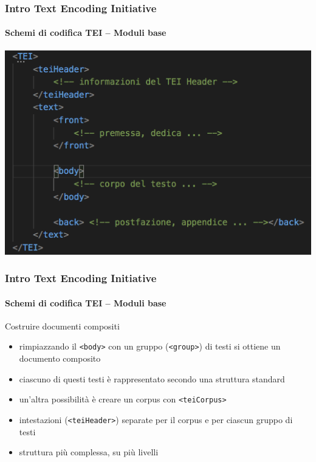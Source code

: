 \begin{frame}
	\frametitle{Intro Text Encoding Initiative}
	\framesubtitle{Schemi di codifica TEI – Moduli base}
	\addtocounter{nframe}{1}


	\begin{center}
		\includegraphics[width=.95\textwidth]{imgs/esempio3.png}
	\end{center}

    
   

\end{frame}



\begin{frame}
	\frametitle{Intro Text Encoding Initiative}
	\framesubtitle{Schemi di codifica TEI – Moduli base}
	\addtocounter{nframe}{1}
    \begin{block}{Costruire documenti compositi}
        \begin{itemize}
            \item rimpiazzando il \texttt{<body>} con un gruppo (\texttt{<group>}) di testi si ottiene un documento composito
            \item ciascuno di questi testi è rappresentato secondo una struttura
            standard
            \item un’altra possibilità è creare un corpus con \texttt{<teiCorpus>}
            \item intestazioni (\texttt{<teiHeader>}) separate per il corpus e per
            ciascun gruppo di testi
            \item struttura più complessa, su più livelli
        \end{itemize}
    \end{block}
\end{frame}



